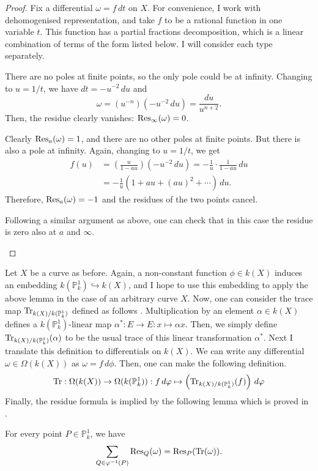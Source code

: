 \begin{proof}
  Fix a differential $\omega=f\,dt$ on $X$. For convenience, I work with
  dehomogenised representation, and take $f$ to be a rational function
  in one variable $t$. This function has a partial fractions decomposition,
  which is a linear combination of terms of the form listed below. I will
  consider each type separately.
  \begin{description}[style=nextline]
    \item[Term of type $\omega=t^{n}\,dt$:] There are no poles at finite
          points, so the only pole could be at infinity. Changing to
          $u=1/t$, we have $dt=-u^{-2}\,du$ and
          \[\omega=(u^{-n})(-u^{-2}\,du)=\frac{du}{u^{n+2}}.\]
          Then, the residue clearly vanishes: $\operatorname{Res}_{\infty}(\omega)=0$.
    \item[Term of type $\omega=\frac{dt}{t-a}$:] Clearly $\operatorname{Res}_{a}(\omega)=1$,
          and there are no other poles at finite points. But there is also a
          pole at infinity. Again, changing to $u=1/t$, we get
          \begin{align*}
            f(u)&=\left(\frac{u}{1-au}\right)(-u^{-2}\,du)
            =-\frac1{u}\cdot\frac1{1-au}\,du \\
            &=-\frac1{u}\left(1+au+(au)^{2}+\cdots\right)\,du.
          \end{align*}
          Therefore, $\operatorname{Res}_{a}(\omega)=-1$ and the residues of the two points
          cancel.
    \item[Term of type $\omega=\frac{dt}{(t-a)^{n}}$ for $n>1$:] Following
          a similar argument as above, one can check that in this case
          the residue is zero also at $a$ and $\infty$.
  \end{description}
\end{proof}
Let $X$ be a curve as before. Again, a non-constant function $\phi\in k(X)$
induces an embedding $k(\mathbb{P}^{1}_{k})\hookrightarrow k(X)$, and I hope
to use this embedding to apply the above lemma in the case of an arbitrary
curve $X$. Now, one can consider the trace map $\operatorname{Tr}_{k(X)/k(\mathbb{P}^{1}_{k})}$
defined as follows \cite{milne}. Multiplication by an element
$\alpha\in k(X)$ defines a $k(\mathbb{P}^{1}_{k})$-linear map
$\alpha^{\ast}: E\to E: x\mapsto \alpha x$. Then, we simply define
$\operatorname{Tr}_{k(X)/k(\mathbb{P}^{1}_{k})}(\alpha)$ to be the usual trace of this linear
transformation $\alpha^{\ast}$. Next I translate this definition to
differentials on $k(X)$. We can write any differential
$\omega\in\Omega(k(X))$ as $\omega=f\,d\phi$. Then, one can make the
following definition.
\[
  \operatorname{Tr}:\Omega(k(X))\to \Omega(k(\mathbb{P}^{1}_{k}))
  :f\,d\varphi\mapsto \left(\operatorname{Tr}_{k(X)/k(\mathbb{P}^{1}_{k})}(f)\right)\,d\varphi
\]
Finally, the residue formula is implied by the following lemma which
is proved in \cite{serre}.
\begin{lemm}
  For every point $P\in\mathbb{P}^{1}_{k}$, we have
  \[
    \sum_{Q\in\varphi^{-1}(P)}\operatorname{Res}_{Q}(\omega)=\operatorname{Res}_{P}(\operatorname{Tr}(\omega)).
  \]
\end{lemm}

